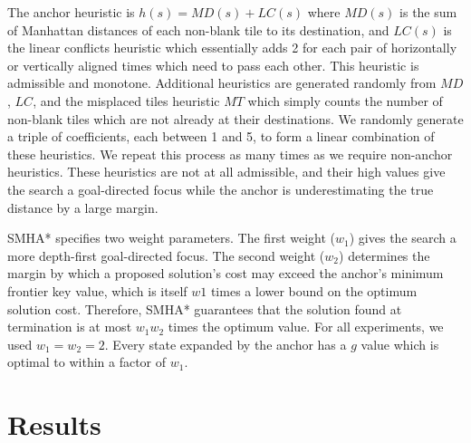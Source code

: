 \documentclass[11pt]{article}
\begin{document}
The anchor heuristic is $h(s) = MD(s) + LC(s)$ where $MD(s)$ is the sum of Manhattan distances of each non-blank tile to its destination, and $LC(s)$ is the linear conflicts heuristic which essentially adds 2 for each pair of horizontally or vertically aligned times which need to pass each other. This heuristic is admissible and monotone. Additional heuristics are generated randomly from $MD$, $LC$, and the misplaced tiles heuristic $MT$ which simply counts the number of non-blank tiles which are not already at their destinations. We randomly generate a triple of coefficients, each between 1 and 5, to form a linear combination of these heuristics. We repeat this process as many times as we require non-anchor heuristics. These heuristics are not at all admissible, and their high values give the search a goal-directed focus while the anchor is underestimating the true distance by a large margin.



SMHA* specifies two weight parameters. The first weight ($w_1$) gives the search a more depth-first goal-directed focus. The second weight ($w_2$) determines the margin by which a proposed solution's cost may exceed the anchor's minimum frontier key value, which is itself $w1$ times a lower bound on the optimum solution cost. Therefore, SMHA* guarantees that the solution found at termination is at most $w_1 w_2$ times the optimum value. For all experiments, we used $w_1 = w_2 = 2$. Every state expanded by the anchor has a $g$ value which is optimal to within a factor of $w_1$.

\section{Results}
\end{document}
